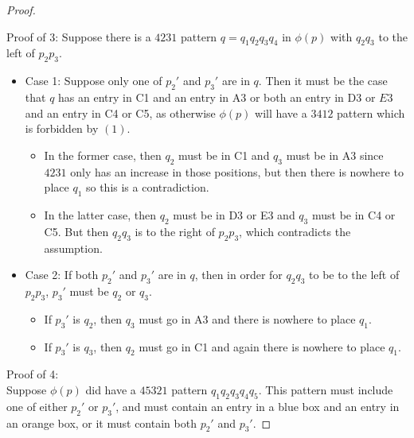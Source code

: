 \documentclass[10pt,a4paper]{amsart}
\begin{document}
\begin{proof}
\begin{itemize}
    \end{itemize}
     

    \vspace{10pt}
    
    Proof of 3: Suppose there is a $4231$ pattern $q=q_1q_2q_3q_4$ in $\phi(p)$ with $q_2q_3$ to the left of $p_2p_3$.
    \begin{itemize}
        \item Case 1: Suppose only one of $p_2'$ and $p_3'$ are in $q$. Then it must be the case that $q$ has an entry in C1 and an entry in A3 or both an entry in D3 or $E3$ and an entry in C4 or C5, as otherwise $\phi(p)$ will have a $3412$ pattern which is forbidden by $(1)$.
        \begin{itemize}
            \item In the former case, then $q_2$ must be in C1 and $q_3$ must be in A3 since $4231$ only has an increase in those positions, but then there is nowhere to place $q_1$ so this is a contradiction. 
            \item In the latter case, then $q_2$ must be in D3 or E3 and $q_3$ must be in C4 or C5. But then $q_2q_3$ is to the right of $p_2p_3$, which contradicts the assumption.
        \end{itemize}
        \item Case 2: If both $p_2'$ and $p_3'$ are in $q$, then in order for $q_2q_3$ to be to the left of $p_2p_3$, $p_3'$ must be $q_2$ or $q_3$. 
        \begin{itemize}
            \item If $p_3'$ is $q_2$, then $q_3$ must go in A3 and there is nowhere to place $q_1$.
            \item If $p_3'$ is $q_3$, then $q_2$ must go in C1 and again there is nowhere to place $q_1$.
        \end{itemize}
    \end{itemize}


    \vspace{10pt}
    
    Proof of 4:
    \\
    Suppose $\phi(p)$ did have a $45321$ pattern $q_1q_2q_3q_4q_5$. This pattern must include one of either $p_2'$ or $p_3'$, and must contain an entry in a blue box and an entry in an orange box, or it must contain both $p_2'$ and $p_3'$.


\end{proof}
\end{document}
